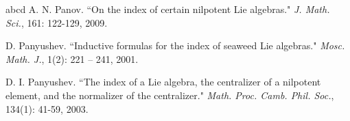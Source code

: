 \documentclass[letterpaper,10pt]{article}
\begin{document}
\begin{thebibliography}{abcd}
A. N. Panov. ``On the index of certain nilpotent Lie algebras." \textit{J. Math. Sci.}, 161: 122-129, 2009.

 D. Panyushev.  ``Inductive formulas for the index of seaweed Lie algebras."  \textit{Mosc. Math. J.}, 1(2): 221 -- 241, 2001.

D. I. Panyushev. ``The index of a Lie algebra, the centralizer of a nilpotent element, and the normalizer of the centralizer." \textit{Math. Proc. Camb. Phil. Soc.}, 134(1): 41-59, 2003.



\end{thebibliography}
\end{document}
